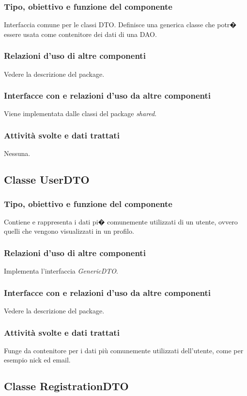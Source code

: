 \subsubsection*{Tipo, obiettivo e funzione del componente}
Interfaccia comune per le classi DTO. Definisce una generica classe che potr�
essere usata come contenitore dei dati di una DAO.
\subsubsection*{Relazioni d'uso di altre componenti}
Vedere la descrizione del package.
\subsubsection*{Interfacce con e relazioni d'uso da altre componenti}
Viene implementata dalle classi del package \textit{shared}.
\subsubsection*{Attivit\`a svolte e dati trattati}
Nessuna. 

\subsection{Classe UserDTO}
\subsubsection*{Tipo, obiettivo e funzione del componente}
Contiene e rappresenta i dati pi� comunemente utilizzati di un utente, ovvero
quelli che vengono visualizzati in un profilo.
\subsubsection*{Relazioni d'uso di altre componenti}
Implementa l'interfaccia \textit{GenericDTO}.
\subsubsection*{Interfacce con e relazioni d'uso da altre componenti}
Vedere la descrizione del package.
\subsubsection*{Attivit\`a svolte e dati trattati}
Funge da contenitore per i dati pi\`u comunemente utilizzati dell'utente, come
per esempio nick ed email.

\subsection{Classe RegistrationDTO}
